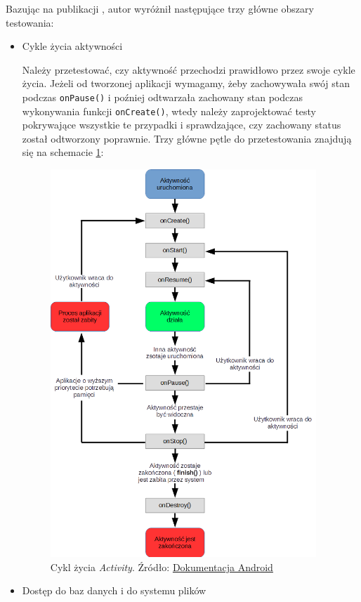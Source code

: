 Bazując na publikacji \cite{bib:android:testing:learning}, autor wyróżnił następujące trzy główne obszary testowania:

\begin{itemize}
\item{Cykle życia aktywności}

Należy przetestować, czy aktywność przechodzi prawidłowo przez swoje cykle życia. Jeżeli od tworzonej aplikacji wymagamy, żeby zachowywała swój stan podczas \texttt{onPause()} i poźniej odtwarzała zachowany stan podczas wykonywania funkcji \texttt{onCreate()}, wtedy należy zaprojektować testy pokrywające wszystkie te przypadki i sprawdzające, czy zachowany status został odtworzony poprawnie. Trzy główne pętle do przetestowania znajdują się na schemacie \ref{fig:sample_figure}:
\begin{figure}[!htb]
    \centering
    \includegraphics[width=10cm]{imgs/ch2_activity_lifecycle.png}
    \caption{Cykl życia \textit{Activity}. Źródło: \href{http://developer.android.com/reference/android/app/Activity.html}{Dokumentacja Android}}
    \label{fig:sample_figure}
\end{figure} 


\item{Dostęp do baz danych i do systemu plików}


\end{itemize}
